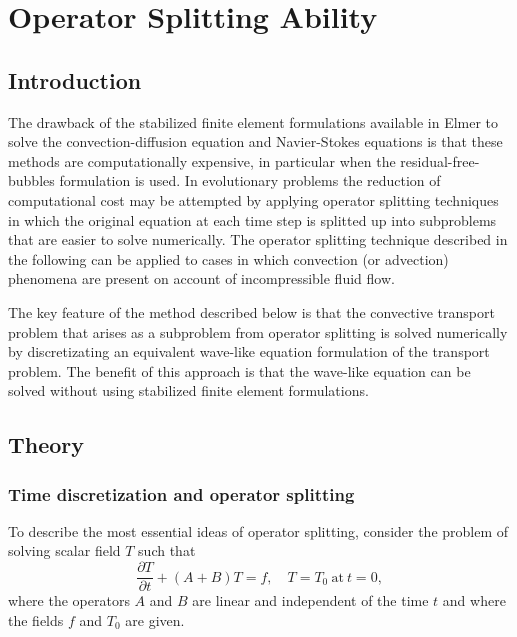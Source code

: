 \chapter{Operator Splitting Ability}
\noindent
{}

\section{Introduction}

The drawback of the stabilized finite element formulations available
in Elmer to solve the convection-diffusion equation and Navier-Stokes 
equations is that these methods are computationally expensive, in particular
when the residual-free-bubbles formulation is used.
In evolutionary problems the reduction of computational cost may be attempted 
by applying operator splitting techniques in which the original equation at 
each time step is splitted up into subproblems that are 
easier to solve numerically. The operator splitting technique described in 
the following can be applied to cases in which convection (or advection) 
phenomena are present on account of incompressible fluid flow. 

The key feature of the method described below is that the convective transport 
problem that arises as a subproblem from operator splitting is solved 
numerically by discretizating an equivalent wave-like equation formulation of 
the transport problem. The benefit of this approach is that the wave-like 
equation can be solved without using stabilized finite element formulations.

\section{Theory}

\subsection{Time discretization and operator splitting}

To describe the most essential ideas of operator splitting, consider the 
problem of solving scalar field $T$ such that
\begin{equation}\label{modeleq}
\frac{\partial T}{\partial t}+(A+B)T=f, \quad T=T_0 \ \mathrm{at}\ t=0,
\end{equation} 
where the operators $A$ and $B$ are linear and independent of the time $t$ and 
where the fields $f$ and $T_0$ are given. 

